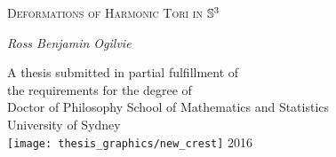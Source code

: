 
\cleardoublepage\thispagestyle{empty}
\begin{center}
{\huge{\scshape Deformations of Harmonic Tori in} $\S^3$\par}
\vspace{2cm}
{\Large\itshape Ross Benjamin Ogilvie \par}
\vfil\vfil\vfil
    A thesis submitted in partial fulfillment of\\
    the requirements for the degree of\\
    Doctor of Philosophy
\vfil\vfil
  {\large{School of Mathematics and Statistics}\\[5pt]
  University of Sydney}\\
  \vskip6mm
  \texttt{[image: thesis\_graphics/new\_crest]}
\vfil
  \normalsize 2016
\vfil
\end{center}
\cleardoublepage
